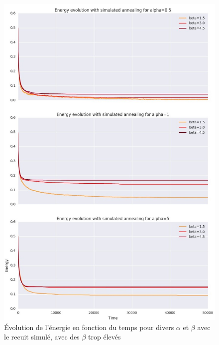 \documentclass[twocolumn]{article}
\begin{document}
\begin{figure}[!h]
	\includegraphics[width=\columnwidth]{../tobekept/skype_2.jpg}
	\caption{Évolution de l'énergie en fonction du temps pour divers $\alpha$ et $\beta$ avec le recuit simulé, avec des $\beta$ trop élevés}
\end{figure}
\end{document}
